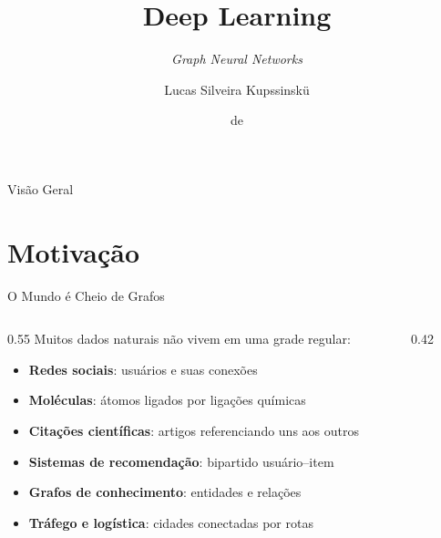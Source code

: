 \documentclass[aspectratio=169,xcolor=dvipsnames]{beamer}
\title{Deep Learning}
\subtitle{\textit{Graph Neural Networks}}
\author{Lucas Silveira Kupssinskü}
\institute
{
    Machine Learning Theory and Applications Laboratory \\
    PUCRS
}
\date{\mespor de \the\year}
\begin{document}
  \begin{frame}
    \titlepage
  \end{frame}

  \begin{frame}{Visão Geral}
    \tableofcontents
  \end{frame}

  \section{Motivação}

  \begin{frame}{O Mundo é Cheio de Grafos}
    \begin{columns}[T]
      \begin{column}{0.55\textwidth}
        Muitos dados naturais não vivem em uma grade regular:
        \begin{itemize}
          \item \textbf{Redes sociais}: usuários e suas conexões
          \item \textbf{Moléculas}: átomos ligados por ligações químicas
          \item \textbf{Citações científicas}: artigos referenciando uns aos outros
          \item \textbf{Sistemas de recomendação}: bipartido usuário--item
          \item \textbf{Grafos de conhecimento}: entidades e relações
          \item \textbf{Tráfego e logística}: cidades conectadas por rotas
        \end{itemize}
      \end{column}
      \begin{column}{0.42\textwidth}
        \centering
\end{column}
\end{columns}
\end{frame}
\end{document}
